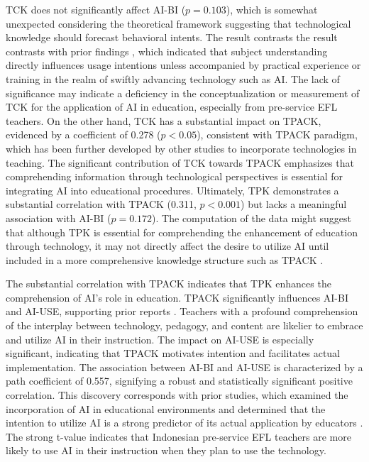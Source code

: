 \documentclass[english]{textolivre}
\begin{document}
TCK does not significantly affect AI-BI ($p = 0.103$), which is somewhat unexpected considering the theoretical framework suggesting that technological knowledge should forecast behavioral intents. The result contrasts the result contrasts with prior findings \cite{an2023ai,habibi2020tpack,mailizar2021tpack,sofyan2023tpack}, which indicated that subject understanding directly influences usage intentions unless accompanied by practical experience or training in the realm of swiftly advancing technology such as AI. The lack of significance may indicate a deficiency in the conceptualization or measurement of TCK for the application of AI in education, especially from pre-service EFL teachers. On the other hand, TCK has a substantial impact on TPACK, evidenced by a coefficient of 0.278 ($p < 0.05$), consistent with \textcite{mishra2009tpack} TPACK paradigm, which has been further developed by other studies \cite{an2023ai,mailizar2021tpack,sofyan2023tpack} to incorporate technologies in teaching. The significant contribution of TCK towards TPACK emphasizes that comprehending information through technological perspectives is essential for integrating AI into educational procedures. Ultimately, TPK demonstrates a substantial correlation with TPACK (0.311, $p < 0.001$) but lacks a meaningful association with AI-BI ($p = 0.172$). The computation of the data might suggest that although TPK is essential for comprehending the enhancement of education through technology, it may not directly affect the desire to utilize AI until included in a more comprehensive knowledge structure such as TPACK \cite{an2023ai,habibi2020tpack,mailizar2021tpack,mansour2024stem}. 

The substantial correlation with TPACK indicates that TPK enhances the comprehension of AI’s role in education. TPACK significantly influences AI-BI and AI-USE, supporting prior reports \cite{an2023ai,habibi2020tpack,mailizar2021tpack,mansour2024stem,sofyan2023tpack}. Teachers with a profound comprehension of the interplay between technology, pedagogy, and content are likelier to embrace and utilize AI in their instruction. The impact on AI-USE is especially significant, indicating that TPACK motivates intention and facilitates actual implementation. The association between AI-BI and AI-USE is characterized by a path coefficient of 0.557, signifying a robust and statistically significant positive correlation. This discovery corresponds with prior studies, which examined the incorporation of AI in educational environments and determined that the intention to utilize AI is a strong predictor of its actual application by educators \cite{barjestesh2025digital,baskara2024ai,lavidas2024ai,raman2023vr,strzelecki2024chatgpt,xiaohong2024intentions}. The strong t-value indicates that Indonesian pre-service EFL teachers are more likely to use AI in their instruction when they plan to use the technology.
\end{document}
